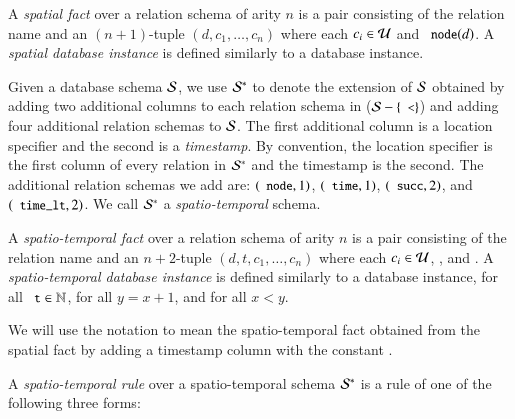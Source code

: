 A {\em spatial fact} over a relation schema of arity $n$ is a pair consisting of the relation name and an $(n+1)$-tuple $(d,c_1,\ldots,c_n)$ where each $c_i \in \mathcal{U}$ and $\dedalus{node}(d)$.  A {\em spatial database instance} is defined similarly to a database instance.

Given a database schema $\mathcal{S}$, we use $\mathcal{S}^*$ to denote the extension of
$\mathcal{S}$ obtained by adding two additional columns to each relation schema in ($\schema - \{\dedalus{<}\}$) and adding four additional relation schemas to $\mathcal{S}$. 
The first additional column is a location specifier and the second is a {\em timestamp}.  By convention, the location specifier is the first column of every relation in $\mathcal{S}^*$ and the timestamp is the second.  
The additional relation schemas we add are: $(\dedalus{node},1)$,
$(\dedalus{time},1)$, $(\dedalus{succ},2)$, and $(\dedalus{time_lt},2)$.
We call $\mathcal{S}^*$ a {\em spatio-temporal} schema.

A {\em spatio-temporal fact} over a relation schema of arity $n$ is a pair consisting of the relation name and an $n+2$-tuple $(d,t,c_1,\ldots,c_n)$ where each $c_i \in \mathcal{U}$, , and .  A {\em spatio-temporal database instance} is defined similarly to a database instance,  for all $\dedalus{t} \in \mathbb{N}$,  for all $y = x + 1$, and  for all $x < y$.

We will use the notation  to mean the spatio-temporal fact obtained from the spatial fact  by adding a timestamp column with the constant .

A {\em spatio-temporal rule} over a spatio-temporal schema $\mathcal{S}^*$ is a rule of one of the following three forms:

